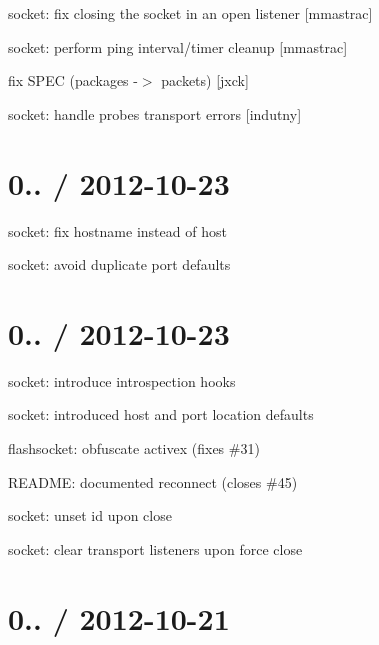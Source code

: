 \begin{DoxyItemize}
\item socket\+: fix closing the socket in an {\ttfamily open} listener \mbox{[}mmastrac\mbox{]}
\item socket\+: perform ping interval/timer cleanup \mbox{[}mmastrac\mbox{]}
\item fix S\+P\+EC (packages -\/$>$ packets) \mbox{[}jxck\mbox{]}
\item socket\+: handle probe\textquotesingle{}s transport errors \mbox{[}indutny\mbox{]}
\end{DoxyItemize}

\section*{0.. / 2012-\/10-\/23 }


\begin{DoxyItemize}
\item socket\+: fix {\ttfamily hostname} instead of {\ttfamily host}
\item socket\+: avoid duplicate {\ttfamily port} defaults
\end{DoxyItemize}

\section*{0.. / 2012-\/10-\/23 }


\begin{DoxyItemize}
\item socket\+: introduce introspection hooks
\item socket\+: introduced {\ttfamily host} and {\ttfamily port} {\ttfamily location} defaults
\item flashsocket\+: obfuscate activex (fixes \#31)
\item R\+E\+A\+D\+ME\+: documented reconnect (closes \#45)
\item socket\+: unset {\ttfamily id} upon close
\item socket\+: clear transport listeners upon force close
\end{DoxyItemize}

\section*{0.. / 2012-\/10-\/21 }


